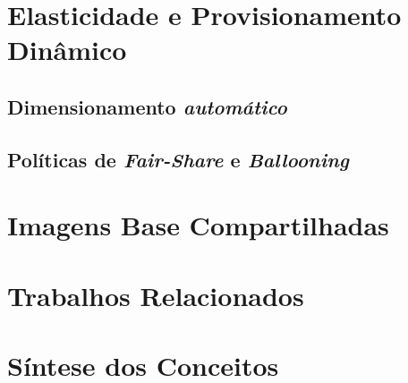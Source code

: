 \section{Elasticidade e Provisionamento Dinâmico}

\subsection{Dimensionamento \textit{automático}}

\subsection{Políticas de \textit{Fair-Share} e \textit{Ballooning}}

\section{Imagens Base Compartilhadas}

\section{Trabalhos Relacionados}

\section{Síntese dos Conceitos}
